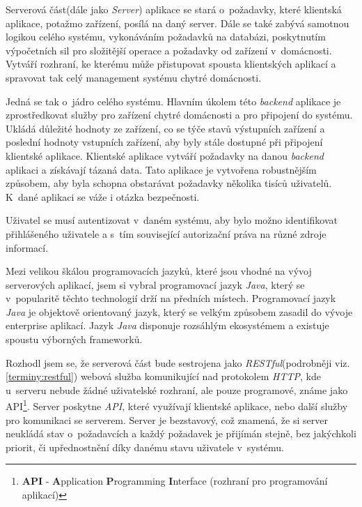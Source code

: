Serverová část(dále jako \emph{Server}) aplikace se stará o~požadavky, které klientská aplikace, potažmo zařízení, posílá na daný server.
Dále se také zabývá samotnou logikou celého systému, vykonáváním požadavků na databázi, poskytnutím výpočetních sil pro složitější operace a požadavky od zařízení v~domácnosti.
Vytváří rozhraní, ke kterému může přistupovat spousta klientských aplikací a spravovat tak celý management systému chytré domácnosti.

Jedná se tak o~jádro celého systému.
Hlavním úkolem této \emph{backend} aplikace je zprostředkovat služby pro zařízení chytré domácnosti a pro připojení do systému.
Ukládá důležité hodnoty ze zařízení, co se týče stavů výstupních zařízení a poslední hodnoty vstupních zařízení, aby byly stále dostupné při připojení klientské aplikace.
Klientské aplikace vytváří požadavky na danou \emph{backend} aplikaci a získávají tázaná data.
Tato aplikace je vytvořena robustnějším způsobem, aby byla schopna obstarávat požadavky několika tisíců uživatelů.
K~dané aplikaci se váže i otázka bezpečnosti.

Uživatel se musí autentizovat v~daném systému, aby bylo možno identifikovat přihlášeného uživatele a s~tím související autorizační práva na různé zdroje informací.

Mezi velikou škálou programovacích jazyků, které jsou vhodné na vývoj serverových aplikací, jsem si vybral programovací jazyk \emph{Java},
který se v~popularitě těchto technologií drží na předních místech. Programovací jazyk \emph{Java} je objektově orientovaný jazyk, který se velkým způsobem zasadil do vývoje enterprise aplikací.
Jazyk \emph{Java} disponuje rozsáhlým ekosystémem a existuje spoustu výborných frameworků.

Rozhodl jsem se, že serverová část bude sestrojena jako \emph{RESTful}(podrobněji viz. \ref{terminy:restful}) webová služba komunikující nad protokolem \emph{HTTP},
kde u~serveru nebude žádné uživatelské rozhraní, ale pouze programové, známe jako API\footnote{\textbf{API} - \textbf{A}pplication \textbf{P}rogramming \textbf{I}nterface (rozhraní pro programování aplikací)}.
Server poskytne \emph{API}, které využívají klientské aplikace, nebo další služby pro komunikaci se serverem.
Server je bezstavový, což znamená, že si server neukládá stav o~požadavcích a každý požadavek je přijímán stejně, bez jakýchkoli priorit, či upřednostnění díky danému stavu uživatele v~systému.

